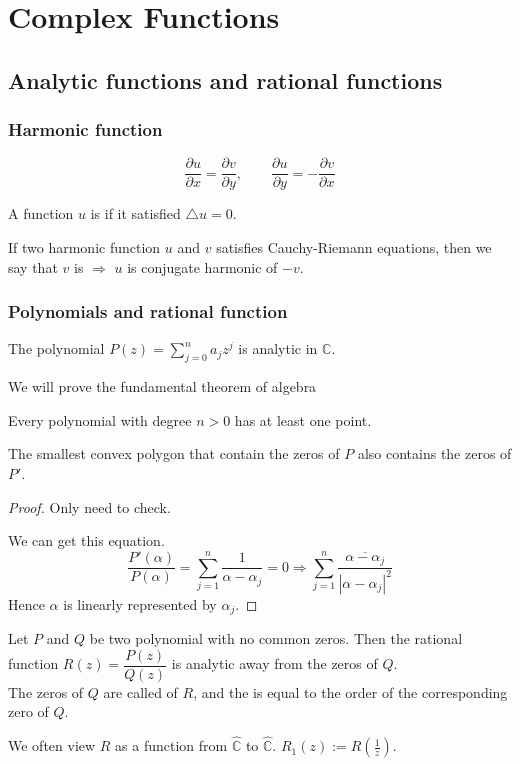 \section{Complex Functions}
\subsection{Analytic functions and rational functions}
\subsubsection{Harmonic function}
\begin{definition}
    \[\frac{\partial u}{\partial x}=\frac{\partial v}{\partial y},\qquad\frac{\partial u }{\partial y}=-\frac{\partial v}{\partial x}\]
\end{definition}
\begin{definition}
    A function  $ u  $ is  if it satisfied   $ \triangle u=0 $. 
    
    If two harmonic function  $ u  $ and  $ v  $ satisfies Cauchy-Riemann equations, then we say that  $ v  $ is  $ \Rightarrow  $  $ u  $ is conjugate harmonic of  $ -v  $.
\end{definition}
\subsubsection{Polynomials and  rational function}
The polynomial  $ P(z)=\sum\limits_{j=0}^na_jz^j $ is analytic in  $ \mathbb{C} $.

We will prove the fundamental theorem of algebra
\begin{theorem}
    Every polynomial with degree  $ n>0 $ has at least one point. 
\end{theorem} 
\begin{theorem}
    The smallest convex polygon that contain the zeros of  $ P  $ also contains the zeros of  $ P' $. 
\end{theorem}
\begin{proof}
    Only need to check.
    
    We can get this equation.
    \[\frac{P'(\alpha)}{P(\alpha)}=\sum\limits_{j=1}^n\frac{1 }{\alpha-\alpha_j}=0\Rightarrow \sum\limits_{j=1}^n\frac{\overline{\alpha-\alpha_j}}{|\alpha-\alpha_j|^2}\]
    Hence  $ \alpha  $ is linearly represented by  $ \alpha_j $.
\end{proof}
\begin{proposition}
    Let  $ P  $ and  $ Q  $ be two polynomial with no common zeros. Then the rational function  $ R(z)=\dfrac{P(z)}{Q(z)} $ is analytic away from the zeros of  $ Q $.\\
    The zeros of  $ Q  $ are called  of  $ R  $, and the  is equal to the order of the corresponding zero of  $ Q  $. 
\end{proposition}
We often view  $ R  $ as a function from  $ \hat{\mathbb{C}} $ to  $ \hat{\mathbb{C}} $.  $ R_1(z):=R(\frac{1}{z}) $.


